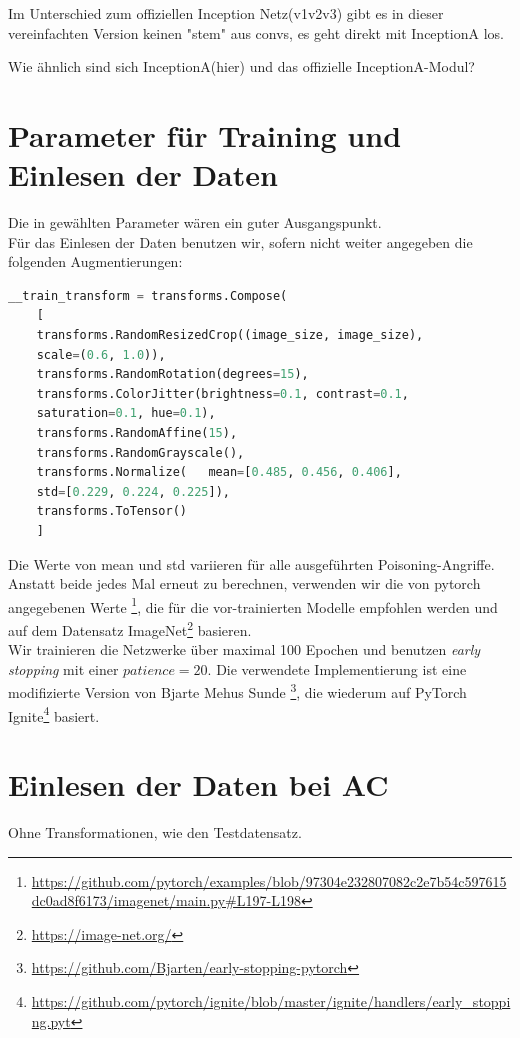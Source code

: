 \documentclass[11pt,a4paper]{article}
\numberwithin{equation}{section}
\begin{document}
	Im Unterschied zum offiziellen Inception Netz(v1v2v3) gibt es in dieser 
	vereinfachten Version keinen "stem" aus convs, 
	es geht direkt mit InceptionA los.
	
	Wie ähnlich sind sich InceptionA(hier) und das offizielle InceptionA-Modul?
	
	\section{Parameter für Training und Einlesen der Daten}\label{param_net}
	Die in \cite{CH} gewählten Parameter wären ein guter Ausgangspunkt.\\
	Für das Einlesen der Daten benutzen wir, sofern nicht weiter angegeben die folgenden Augmentierungen:
	
	\begin{lstlisting}[language=Python, caption=Augemntierung beim Einlesen der Daten]
	__train_transform = transforms.Compose(
	[
	transforms.RandomResizedCrop((image_size, image_size), 
	scale=(0.6, 1.0)),
	transforms.RandomRotation(degrees=15),
	transforms.ColorJitter(brightness=0.1, contrast=0.1, 
	saturation=0.1, hue=0.1),
	transforms.RandomAffine(15),
	transforms.RandomGrayscale(),
	transforms.Normalize(	mean=[0.485, 0.456, 0.406], 
	std=[0.229, 0.224, 0.225]),
	transforms.ToTensor()
	]
	\end{lstlisting}
	Die Werte von mean und std variieren für alle ausgeführten Poisoning-Angriffe. Anstatt beide jedes Mal erneut zu berechnen, verwenden wir die von pytorch angegebenen Werte \footnote{\url{https://github.com/pytorch/examples/blob/97304e232807082c2e7b54c597615dc0ad8f6173/imagenet/main.py\#L197-L198}}, die für die vor-trainierten Modelle empfohlen werden und auf dem Datensatz ImageNet\footnote{\url{https://image-net.org/}} basieren.\\ 
	Wir trainieren die Netzwerke über maximal 100 Epochen und benutzen \textit{early stopping} mit einer $patience=20$. Die verwendete Implementierung ist eine modifizierte Version von Bjarte Mehus Sunde \footnote{\url{https://github.com/Bjarten/early-stopping-pytorch}}, die wiederum auf PyTorch Ignite\footnote{\url{https://github.com/pytorch/ignite/blob/master/ignite/handlers/early\_stopping.pyt}} basiert.\\
	
	\section{Einlesen der Daten bei AC}
	Ohne Transformationen, wie den Testdatensatz.
	
\end{document}
